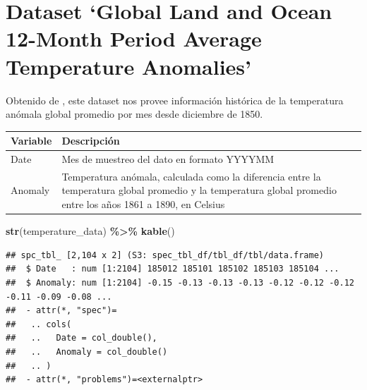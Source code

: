 \documentclass[
]{book}
\newenvironment{Shaded}{\begin{snugshade}}{\end{snugshade}}
\newcommand{\FunctionTok}[1]{\textcolor[rgb]{0.13,0.29,0.53}{\textbf{#1}}}
\newcommand{\NormalTok}[1]{#1}
\newcommand{\SpecialCharTok}[1]{\textcolor[rgb]{0.81,0.36,0.00}{\textbf{#1}}}
\begin{document}
\begin{tabular}{}
\hline

\hline
\end{tabular}

\section{Dataset `Global Land and Ocean 12-Month Period Average Temperature Anomalies'}\label{dataset-global-land-and-ocean-12-month-period-average-temperature-anomalies}

Obtenido de \citep{ref159}, este dataset nos provee información histórica de la temperatura anómala global promedio por mes desde diciembre de 1850.

\begin{longtable}[]{@{}
  >{\raggedright\arraybackslash}p{}
  >{\raggedright\arraybackslash}p{}@{}}
\toprule\noalign{}
\begin{minipage}[b]{\linewidth}\raggedright
Variable
\end{minipage} & \begin{minipage}[b]{\linewidth}\raggedright
Descripción
\end{minipage} \\
\midrule\noalign{}
\endhead
\bottomrule\noalign{}
\endlastfoot
Date & Mes de muestreo del dato en formato YYYYMM \\
Anomaly & Temperatura anómala, calculada como la diferencia entre la temperatura global promedio y la temperatura global promedio entre los años 1861 a 1890, en Celsius \\
\end{longtable}

\begin{Shaded}
\begin{Highlighting}[]
\FunctionTok{str}\NormalTok{(temperature\_data) }\SpecialCharTok{\%\textgreater{}\%} \FunctionTok{kable}\NormalTok{()}
\end{Highlighting}
\end{Shaded}

\begin{verbatim}
## spc_tbl_ [2,104 x 2] (S3: spec_tbl_df/tbl_df/tbl/data.frame)
##  $ Date   : num [1:2104] 185012 185101 185102 185103 185104 ...
##  $ Anomaly: num [1:2104] -0.15 -0.13 -0.13 -0.13 -0.12 -0.12 -0.12 -0.11 -0.09 -0.08 ...
##  - attr(*, "spec")=
##   .. cols(
##   ..   Date = col_double(),
##   ..   Anomaly = col_double()
##   .. )
##  - attr(*, "problems")=<externalptr>
\end{verbatim}
\end{document}
